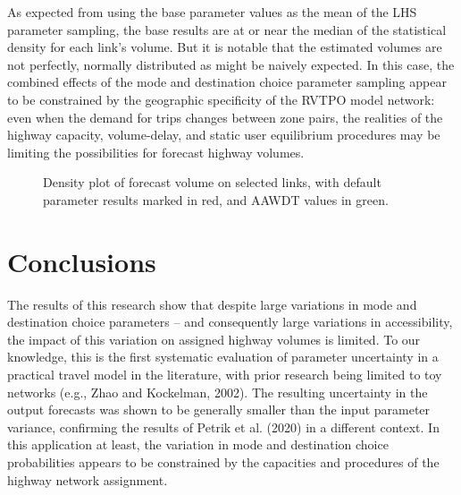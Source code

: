 \documentclass[
  futuretransp,
  submit,
  moreauthors,
]{Definitions/mdpi}
\begin{document}
As expected from using the base parameter values as the mean of the LHS
parameter sampling, the base results are at or near the median of the
statistical density for each link's volume. But it is notable that the
estimated volumes are not perfectly, normally distributed as might be
naively expected. In this case, the combined effects of the mode and
destination choice parameter sampling appear to be constrained by the
geographic specificity of the RVTPO model network: even when the demand
for trips changes between zone pairs, the realities of the highway
capacity, volume-delay, and static user equilibrium procedures may be
limiting the possibilities for forecast highway volumes.

\begin{figure}


\caption{\label{fig-densityplots}Density plot of forecast volume on
selected links, with default parameter results marked in red, and AAWDT
values in green.}

\end{figure}%


\section{Conclusions}\label{sec-conclusions}

The results of this research show that despite large variations in 
mode and destination choice parameters – and consequently large variations
in accessibility, the impact of this variation on assigned highway volumes
is limited. To our knowledge, this is the first systematic evaluation of 
parameter uncertainty in a practical travel model in the literature, with prior
research being limited to toy networks (e.g., Zhao and Kockelman, 2002).
The resulting uncertainty in the output forecasts was shown to be generally smaller 
than the input parameter variance, confirming the results of Petrik et al.
(2020) in a different context.
In this application at least, the variation in mode and
destination choice probabilities appears to be constrained by the
capacities and procedures of the highway network assignment.
\end{document}

